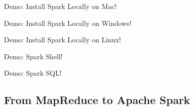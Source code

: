 \begin{frame}
    \centering
    \vfill
    \Large{Demo: Install Spark Locally on Mac!}
    \vfill
\end{frame}

\begin{frame}
    \centering
    \vfill
    \Large{Demo: Install Spark Locally on Windows!}
    \vfill
\end{frame}

\begin{frame}
    \centering
    \vfill
    \Large{Demo: Install Spark Locally on Linux!}
    \vfill
\end{frame}

\begin{frame}
    \centering
    \vfill
    \Large{Demo: Spark Shell!}
    \vfill
\end{frame}

\begin{frame}
    \centering
    \vfill
    \Large{Demo: Spark SQL!}
    \vfill
\end{frame}

\subsection{From MapReduce to Apache Spark}\label{subsec:from-mapreduce-to-apache-spark}

